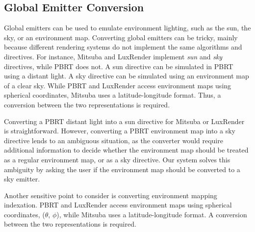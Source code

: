 
\subsection{Global Emitter Conversion}
Global emitters can be used to emulate environment lighting, such as the sun, the
sky, or an environment map. Converting global emitters can be tricky, mainly
because different rendering systems do not implement the same algorithms and directives. 
For instance, Mitsuba and LuxRender implement {\it sun} and {\it sky} directives, while PBRT does not.
A sun directive can be simulated in PBRT using a distant light. A sky directive can
be simulated using an environment map of a clear sky.
While PBRT and LuxRender access environment maps using spherical coordinates, 
Mitsuba uses a latitude-longitude format. Thus, a conversion between the two representations is required. 
  
%
Converting a PBRT distant light into
a sun directive for Mitsuba or LuxRender is straightforward. However, converting a PBRT
environment map into a sky directive lends to an ambiguous situation, as the converter would require additional information to decide 
whether the environment map should be treated as a regular environment map, or as a sky directive.
Our system solves this ambiguity by asking the user if the environment map should be converted to a sky
emitter.

Another sensitive point to consider is converting environment mapping indexation. 
PBRT and LuxRender access environment maps using spherical coordinates, 
($\theta$, $\phi$), 
while Mitsuba uses a latitude-longitude format.   
A conversion between the two representations is required. 


